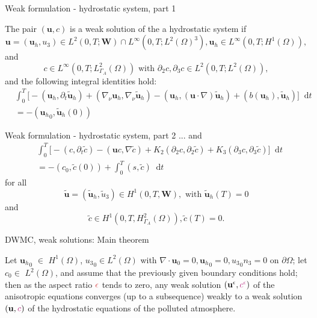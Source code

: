 \documentclass{beamer}
\newcommand*\diff{\mathop{}\!\mathrm{d}}
\begin{document}
\begin{frame}{Weak formulation - hydrostatic system, part 1}

The pair $(\mathbf{u}, c)$ is a weak solution of the a hydrostatic system if
$$\mathbf{u} = (\mathbf{u}_h, u_3) \in L^2 (0, T; \mathbf{W}) \cap L^\infty (0,T; L^2(\Omega)^3), \mathbf{u}_h \in L^\infty(0,T; H^1(\Omega)),$$
and
$$c \in L^\infty (0, T; L^2_{\Gamma_A}(\Omega)) \text{ with } \partial_2 c, \partial_3 c \in L^2(0, T; L^2(\Omega)),$$
and the following integral identities hold:
%
\begin{equation}\nonumber
\begin{split}
& \int_0^T \bigg[ -(\mathbf{u}_h, \partial_t \mathbf{\tilde{u}}_h) + (\nabla_\nu \mathbf{u}_h, \nabla_\nu \mathbf{\tilde{u}}_h) - (\mathbf{u}_h, (\mathbf{u} \cdot \nabla) \mathbf{\tilde{u}}_h) + (b(\mathbf{u}_h), \mathbf{\tilde{u}}_h) \bigg ] \diff t \\
& = - ({\mathbf{u}_h}_0, \mathbf{\tilde{u}}_h(0))
\end{split}
\end{equation}
%
\end{frame}

\begin{frame}{Weak formulation - hydrostatic system, part 2}
... and
%
\begin{equation}\nonumber
\begin{split}
& \int_0^T \bigg[ -(c, \partial_t \tilde{c}) -(\mathbf{u}c, \nabla \tilde{c}) + K_2 (\partial_2 c, \partial_2 \tilde{c}) + K_3 (\partial_3 c, \partial_3 \tilde{c}) \bigg ] \diff t \\
& = - (c_0, \tilde{c}(0)) + \int_0^T (s,\tilde{c}) \diff t
\end{split}
\end{equation}
%
for all
$$\mathbf{\tilde{u}} = (\mathbf{\tilde{u}}_h, \tilde{u}_3) \in H^1 (0,T, \mathbf{W}), \text{ with } \mathbf{\tilde{u}}_h (T) = 0$$
and 
$$\tilde{c} \in H^1 (0,T, H^2_{\Gamma_A} (\Omega)), \tilde{c} (T) = 0.$$
\end{frame}

\begin{frame}{DWMC, weak solutions: Main theorem}

\begin{theorem}
Let ${\mathbf{u}_h}_0$ $\in$ $H^1 (\Omega)$, ${u_3}_0 \in L^2(\Omega)$ with $\nabla \cdot \mathbf{u}_0 = 0, {\mathbf{u}_h}_0 = 0, {u_3}_0 n_3 = 0$ on $\partial \Omega$; let $c_0 \in$ $L^2 (\Omega)$, and assume that the previously \textcolor{mediumred-violet}{given boundary conditions} hold; then as the aspect ratio $\textcolor{jasper}{\epsilon}$ tends to zero, any weak solution $(\mathbf{u}^\epsilon, \textcolor{mediumred-violet}{c^\epsilon})$ of the anisotropic equations converges (up to a subsequence) weakly to a weak solution $(\mathbf{u}, \textcolor{mediumred-violet}{c})$ of the hydrostatic equations of the polluted atmosphere.
\end{theorem}

\end{frame}
\end{document}
